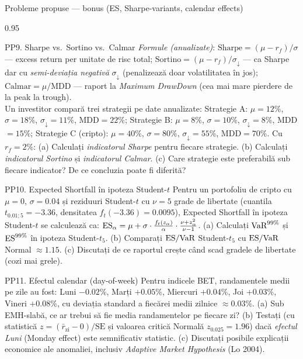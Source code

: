 \documentclass[9pt, aspectratio=169, t]{beamer}
\begin{document}
\begin{frame}[shrink=35]{Probleme propuse --- bonus (ES, Sharpe-variants, calendar effects)}
\begin{cminipage}{0.95\textwidth}
\begin{block}{PP9. Sharpe vs.\ Sortino vs.\ Calmar}
\emph{Formule (anualizate)}: $\text{Sharpe} = (\mu - r_f)/\sigma$ --- excess return per unitate de risc total; $\text{Sortino} = (\mu - r_f)/\sigma_{\downarrow}$ --- ca Sharpe dar cu \emph{semi-deviația negativă} $\sigma_{\downarrow}$ (penalizează doar volatilitatea în jos); $\text{Calmar} = \mu/\text{MDD}$ --- raport la \emph{Maximum DrawDown} (cea mai mare pierdere de la peak la trough).\\[0.2em]
Un investitor compară trei strategii pe date anualizate: Strategie A: $\mu=12\%$, $\sigma=18\%$, $\sigma_{\downarrow}=11\%$, MDD$=22\%$; Strategie B: $\mu=8\%$, $\sigma=10\%$, $\sigma_{\downarrow}=8\%$, MDD$=15\%$; Strategie C (cripto): $\mu=40\%$, $\sigma=80\%$, $\sigma_{\downarrow}=55\%$, MDD$=70\%$. Cu $r_f=2\%$: (a) Calculați \emph{indicatorul Sharpe} pentru fiecare strategie. (b) Calculați \emph{indicatorul Sortino} și \emph{indicatorul Calmar}. (c) Care strategie este preferabilă sub fiecare indicator? De ce concluzia poate fi diferită?
\end{block}
\begin{block}{PP10. Expected Shortfall în ipoteza Student-$t$}
Pentru un portofoliu de cripto cu $\mu=0$, $\sigma=0.04$ și reziduuri Student-$t$ cu $\nu=5$ grade de libertate (cuantila $t_{0.01;5}=-3.36$, densitatea $f_t(-3.36)=0.0095$), Expected Shortfall în ipoteza Student-$t$ se calculează ca: $\text{ES}_\alpha = \mu + \sigma \cdot \frac{f_t(z_\alpha)}{\alpha}\cdot\frac{\nu + z_\alpha^2}{\nu-1}$. (a) Calculați $\text{VaR}^{99\%}$ și $\text{ES}^{99\%}$ în ipoteza Student-$t_5$. (b) Comparați $\text{ES}/\text{VaR}$ Student-$t_5$ cu $\text{ES}/\text{VaR}$ Normal $\approx 1.15$. (c) Discutați de ce raportul crește când scad gradele de libertate (cozi mai grele).
\end{block}
\begin{block}{PP11. Efectul calendar (day-of-week)}
Pentru indicele BET, randamentele medii pe zile au fost: Luni $-0.02\%$, Marți $+0.05\%$, Miercuri $+0.04\%$, Joi $+0.03\%$, Vineri $+0.08\%$, cu deviația standard a fiecărei medii zilnice $\approx 0.03\%$. (a) Sub EMH-slabă, ce ar trebui să fie media randamentelor pe fiecare zi? (b) Testați (cu statistică $z = (\bar r_{\text{zi}} - 0) / \text{SE}$ și valoarea critică Normală $z_{0.025}=1.96$) dacă \emph{efectul Luni} (Monday effect) este semnificativ statistic. (c) Discutați posibile explicații economice ale anomaliei, inclusiv \emph{Adaptive Market Hypothesis} (Lo 2004).
\end{block}
\end{cminipage}
\end{frame}
\end{document}
